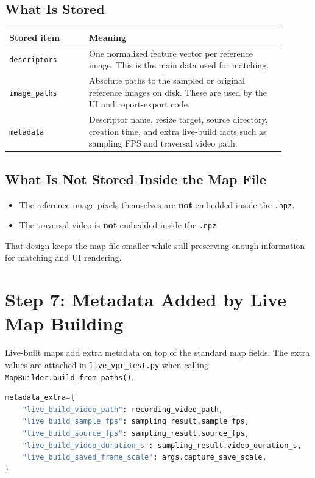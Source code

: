 \documentclass[11pt]{article}
\newcommand{\file}[1]{\texttt{#1}}
\newcommand{\code}[1]{\texttt{#1}}
\begin{document}
\subsection{What Is Stored}
\begin{longtable}{p{0.26\linewidth} p{0.64\linewidth}}
\toprule
\textbf{Stored item} & \textbf{Meaning} \\
\midrule
\code{descriptors} & One normalized feature vector per reference image. This is the main data used for matching. \\
\code{image\_paths} & Absolute paths to the sampled or original reference images on disk. These are used by the UI and report-export code. \\
\code{metadata} & Descriptor name, resize target, source directory, creation time, and extra live-build facts such as sampling FPS and traversal video path. \\
\bottomrule
\end{longtable}

\subsection{What Is Not Stored Inside the Map File}
\begin{itemize}[leftmargin=*]
  \item The reference image pixels themselves are \textbf{not} embedded inside the \file{.npz}.
  \item The traversal video is \textbf{not} embedded inside the \file{.npz}.
\end{itemize}

That design keeps the map file smaller while still preserving enough information for matching and UI rendering.

\section{Step 7: Metadata Added by Live Map Building}
Live-built maps add extra metadata on top of the standard map fields. The extra values are attached in \file{live\_vpr\_test.py} when calling \code{MapBuilder.build\_from\_paths()}.

\begin{lstlisting}[style=repo,language=Python,caption={Live-build metadata extras.}]
metadata_extra={
    "live_build_video_path": recording_video_path,
    "live_build_sample_fps": sampling_result.sample_fps,
    "live_build_source_fps": sampling_result.source_fps,
    "live_build_video_duration_s": sampling_result.video_duration_s,
    "live_build_saved_frame_scale": args.capture_save_scale,
}
\end{lstlisting}
\end{document}
